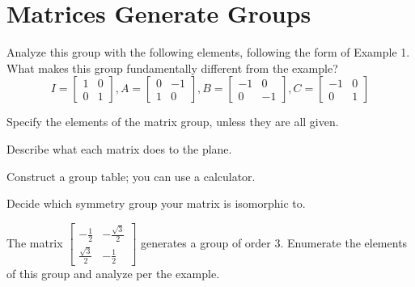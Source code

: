 \documentclass[../gatm_answers.tex]{subfiles}
\begin{document}
\section{Matrices Generate Groups}

\begin{outer_problem}[start=1]
\item Analyze this group with the following elements, following the form of Example 1. What makes this group fundamentally different from the example?
$$I=\left[\begin{array}{cc} 1 & 0 \\ 0 & 1 \end{array}\right], A=\left[\begin{array}{cc} 0 & -1 \\ 1 & 0 \end{array}\right], B=\left[\begin{array}{cc} -1 & 0 \\ 0 & -1 \end{array}\right], C=\left[\begin{array}{cc} -1 & 0 \\ 0 & 1 \end{array}\right]$$
\end{outer_problem}

\begin{iinner_problem}[start=1]
\item Specify the elements of the matrix group, unless they are all given.
\end{iinner_problem}

\begin{iinner_problem}
\item Describe what each matrix does to the plane.
\end{iinner_problem}

\begin{iinner_problem}
\item Construct a group table; you can use a calculator.
\end{iinner_problem}

\begin{iinner_problem}
\item Decide which symmetry group your matrix is isomorphic to.
\end{iinner_problem}

\begin{outer_problem}
\item The matrix $\left[\begin{array}{cc} -\frac{1}{2} & -\frac{\sqrt{3}}{2} \\ \frac{\sqrt{3}}{2} & -\frac{1}{2}\end{array}\right]$ generates a group of order $3$. Enumerate the elements of this group and analyze per the example.
\end{outer_problem}
\end{document}
